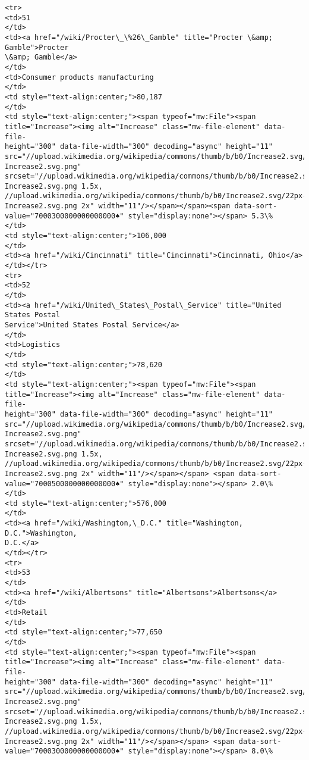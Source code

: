 \documentclass[11pt]{article}
\begin{document}
\begin{Verbatim}[commandchars=\\\{\}]
<tr>
<td>51
</td>
<td><a href="/wiki/Procter\_\%26\_Gamble" title="Procter \&amp; Gamble">Procter
\&amp; Gamble</a>
</td>
<td>Consumer products manufacturing
</td>
<td style="text-align:center;">80,187
</td>
<td style="text-align:center;"><span typeof="mw:File"><span
title="Increase"><img alt="Increase" class="mw-file-element" data-file-
height="300" data-file-width="300" decoding="async" height="11"
src="//upload.wikimedia.org/wikipedia/commons/thumb/b/b0/Increase2.svg/11px-
Increase2.svg.png"
srcset="//upload.wikimedia.org/wikipedia/commons/thumb/b/b0/Increase2.svg/17px-
Increase2.svg.png 1.5x,
//upload.wikimedia.org/wikipedia/commons/thumb/b/b0/Increase2.svg/22px-
Increase2.svg.png 2x" width="11"/></span></span><span data-sort-
value="7000300000000000000♠" style="display:none"></span> 5.3\%
</td>
<td style="text-align:center;">106,000
</td>
<td><a href="/wiki/Cincinnati" title="Cincinnati">Cincinnati, Ohio</a>
</td></tr>
<tr>
<td>52
</td>
<td><a href="/wiki/United\_States\_Postal\_Service" title="United States Postal
Service">United States Postal Service</a>
</td>
<td>Logistics
</td>
<td style="text-align:center;">78,620
</td>
<td style="text-align:center;"><span typeof="mw:File"><span
title="Increase"><img alt="Increase" class="mw-file-element" data-file-
height="300" data-file-width="300" decoding="async" height="11"
src="//upload.wikimedia.org/wikipedia/commons/thumb/b/b0/Increase2.svg/11px-
Increase2.svg.png"
srcset="//upload.wikimedia.org/wikipedia/commons/thumb/b/b0/Increase2.svg/17px-
Increase2.svg.png 1.5x,
//upload.wikimedia.org/wikipedia/commons/thumb/b/b0/Increase2.svg/22px-
Increase2.svg.png 2x" width="11"/></span></span> <span data-sort-
value="7000500000000000000♠" style="display:none"></span> 2.0\%
</td>
<td style="text-align:center;">576,000
</td>
<td><a href="/wiki/Washington,\_D.C." title="Washington, D.C.">Washington,
D.C.</a>
</td></tr>
<tr>
<td>53
</td>
<td><a href="/wiki/Albertsons" title="Albertsons">Albertsons</a>
</td>
<td>Retail
</td>
<td style="text-align:center;">77,650
</td>
<td style="text-align:center;"><span typeof="mw:File"><span
title="Increase"><img alt="Increase" class="mw-file-element" data-file-
height="300" data-file-width="300" decoding="async" height="11"
src="//upload.wikimedia.org/wikipedia/commons/thumb/b/b0/Increase2.svg/11px-
Increase2.svg.png"
srcset="//upload.wikimedia.org/wikipedia/commons/thumb/b/b0/Increase2.svg/17px-
Increase2.svg.png 1.5x,
//upload.wikimedia.org/wikipedia/commons/thumb/b/b0/Increase2.svg/22px-
Increase2.svg.png 2x" width="11"/></span></span> <span data-sort-
value="7000300000000000000♠" style="display:none"></span> 8.0\%

\end{Verbatim}
\end{document}
